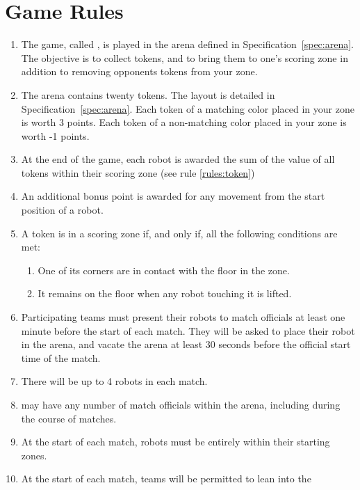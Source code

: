 \section{Game Rules}
\label{sec:rules}

\begin{enumerate}
  \item The game, called \emph{\gamename}, is played in the arena defined in
        Specification~\ref{spec:arena}. The objective is to collect tokens, and
        to bring them to one's scoring zone in addition to removing opponents
        tokens from your zone.
  \item The arena contains twenty tokens. The layout is detailed in
        Specification~\ref{spec:arena}. Each token of a matching color placed in your
        zone is worth 3 points. Each token of a non-matching color placed in your zone is
        worth -1 points.
  \item At the end of the game, each robot is awarded the sum of the value of
        all tokens within their scoring zone (see rule \ref{rules:token})
  \item An additional bonus point is awarded for any movement from the
        start position of a robot.
  \item \label{rules:token}A token is in a scoring zone if, and only if, all the following
        conditions are met:
        \begin{enumerate}
          \item One of its corners are in contact with the floor in
                the zone.
          \item It remains on the floor when any robot touching it is lifted.
        \end{enumerate}
  \item Participating teams must present their robots to match officials at
        least one minute before the start of each match. They will be asked to
        place their robot in the arena, and vacate the arena at least 30 seconds
        before the official start time of the match.
  \item There will be up to 4 robots in each match.
  \item \org may have any number of match officials within the arena, including
        during the course of matches.
  \item At the start of each match, robots must be entirely within their
        starting zones.
  \item At the start of each match, teams will be permitted to lean into the

\end{enumerate}
